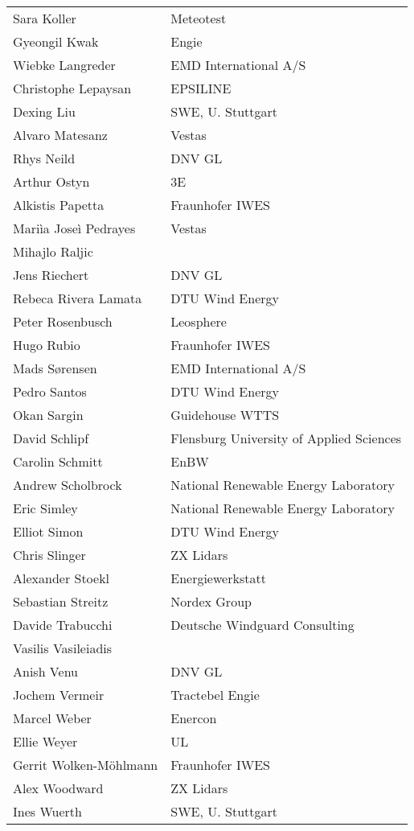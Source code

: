 \begin{supertabular}{@{}|p{0.45\columnwidth}|p{0.55\columnwidth}|@{}}
 Sara Koller & Meteotest \\
 Gyeongil Kwak & Engie \\
 Wiebke Langreder & EMD International A/S \\
 Christophe Lepaysan & EPSILINE \\
 Dexing Liu & SWE, U. Stuttgart \\
 Alvaro Matesanz & Vestas \\
 Rhys Neild & DNV GL \\
 Arthur Ostyn & 3E \\
 Alkistis Papetta & Fraunhofer IWES \\
 Mariìa Joseì Pedrayes & Vestas \\
 Mihajlo Raljic &  \\
 Jens Riechert & DNV GL \\
 Rebeca Rivera Lamata & DTU Wind Energy \\
 Peter Rosenbusch & Leosphere \\
 Hugo Rubio & Fraunhofer IWES \\
 Mads Sørensen & EMD International A/S \\
 Pedro Santos & DTU Wind Energy \\
 Okan Sargin & Guidehouse WTTS \\
 David Schlipf & Flensburg University of Applied Sciences \\
 Carolin Schmitt & EnBW \\
 Andrew Scholbrock & National Renewable Energy Laboratory \\
 Eric Simley & National Renewable Energy Laboratory \\
 Elliot Simon & DTU Wind Energy \\
 Chris Slinger & ZX Lidars \\
 Alexander Stoekl & Energiewerkstatt \\
 Sebastian Streitz & Nordex Group \\
 Davide Trabucchi & Deutsche Windguard Consulting \\
 Vasilis Vasileiadis & \\
 Anish Venu & DNV GL \\
 Jochem Vermeir & Tractebel Engie \\
 Marcel Weber & Enercon \\
 Ellie Weyer & UL \\
 Gerrit Wolken-Möhlmann & Fraunhofer IWES \\
 Alex Woodward & ZX Lidars \\
 Ines Wuerth & SWE, U. Stuttgart \\
\end{supertabular}
 